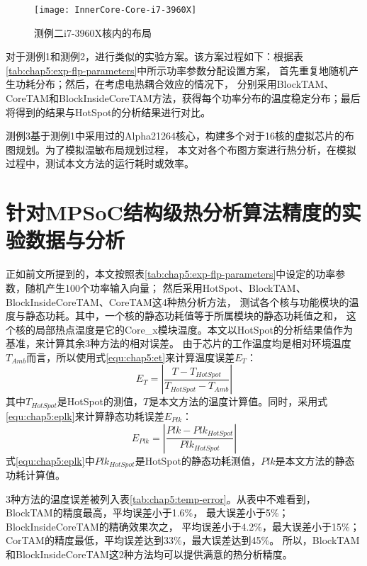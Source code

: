 \begin{figure}[H]
  \centering
  \texttt{[image: InnerCore-Core-i7-3960X]}
  \caption{测例二i7-3960X核内的布局}
  \label{fig:inner-core-core-i7-flp}
\end{figure}

对于测例1和测例2，进行类似的实验方案。该方案过程如下：根据表\ref{tab:chap5:exp-flp-parameters}中所示功率参数分配设置方案， 首先重复地随机产生功耗分布；然后，在考虑电热耦合效应的情况下， 分别采用BlockTAM、CoreTAM和BlockInsideCoreTAM方法，获得每个功率分布的温度稳定分布；最后将得到的结果与HotSpot的分析结果进行对比。

测例3基于测例1中采用过的Alpha21264核心，构建多个对于16核的虚拟芯片的布图规划。为了模拟温敏布局规划过程， 本文对各个布图方案进行热分析，在模拟过程中，测试本文方法的运行耗时或效率。

\section{针对MPSoC结构级热分析算法精度的实验数据与分析}
正如前文所提到的，本文按照表\ref{tab:chap5:exp-flp-parameters}中设定的功率参数，随机产生100个功率输入向量； 然后采用HotSpot、BlockTAM、BlockInsideCoreTAM、CoreTAM这4种热分析方法， 测试各个核与功能模块的温度与静态功耗。其中，一个核的静态功耗值等于所属模块的静态功耗值之和， 这个核的局部热点温度是它的Core\_x模块温度。本文以HotSpot的分析结果值作为基准，来计算其余3种方法的相对误差。 由于芯片的工作温度均是相对环境温度$T_{Amb}$而言，所以使用式\ref{equ:chap5:et}来计算温度误差$E_T$：
\begin{equation}
\label{equ:chap5:et}
E_T = |\frac{T-T_{HotSpot}}{T_{HotSpot}-T_{Amb}}|
\end{equation}
其中$T_{HotSpot}$是HotSpot的测值，$T$是本文方法的温度计算值。同时，采用式\ref{equ:chap5:eplk}来计算静态功耗误差$E_{Plk}$：
\begin{equation}
\label{equ:chap5:eplk}
E_{Plk} = |\frac{Plk-Plk_{HotSpot}}{Plk_{HotSpot}}|
\end{equation}
式\ref{equ:chap5:eplk}中$Plk_{HotSpot}$是HotSpot的静态功耗测值，$Plk$是本文方法的静态功耗计算值。

3种方法的温度误差被列入表\ref{tab:chap5:temp-error}。从表中不难看到，BlockTAM的精度最高，平均误差小于1.6\%， 最大误差小于5\%；BlockInsideCoreTAM的精确效果次之， 平均误差小于4.2\%，最大误差小于15\%；CorTAM的精度最低，平均误差达到33\%，最大误差达到45\%。 所以，BlockTAM和BlockInsideCoreTAM这2种方法均可以提供满意的热分析精度。

